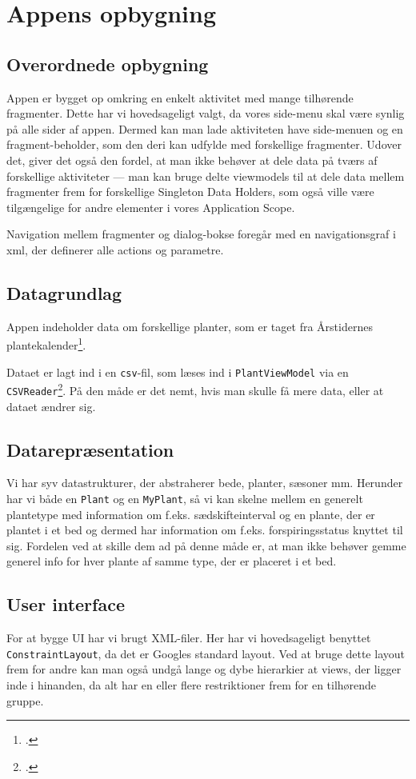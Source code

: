 \section{Appens opbygning}

\subsection{Overordnede opbygning}
Appen er bygget op omkring en enkelt aktivitet med mange tilhørende fragmenter. Dette har vi hovedsageligt valgt, da vores side-menu skal være synlig på alle sider af appen. Dermed kan man lade aktiviteten have side-menuen og en fragment-beholder, som den deri kan udfylde med forskellige fragmenter. Udover det, giver det også den fordel, at man ikke behøver at dele data på tværs af forskellige aktiviteter --- man kan bruge delte viewmodels til at dele data mellem fragmenter frem for forskellige Singleton Data Holders, som også ville være tilgængelige for andre elementer i vores Application Scope.

Navigation mellem fragmenter og dialog-bokse foregår med en navigationsgraf i xml, der definerer alle actions og parametre.

\subsection{Datagrundlag}
Appen indeholder data om forskellige planter, som er taget fra Årstidernes plantekalender\footcite{aarstiderne}.

Dataet er lagt ind i en \texttt{csv}-fil, som læses ind i \texttt{PlantViewModel} via en \texttt{CSVReader}\footcite{opencsv}. På den måde er det nemt, hvis man skulle få mere data, eller at dataet ændrer sig. 

\subsection{Datarepræsentation}

Vi har syv datastrukturer, der abstraherer bede, planter, sæsoner mm. Herunder har vi både en \texttt{Plant} og en \texttt{MyPlant}, så vi kan skelne mellem en generelt plantetype med information om f.eks. sædskifteinterval og en plante, der er plantet i et bed og dermed har information om f.eks. forspiringsstatus knyttet til sig. Fordelen ved at skille dem ad på denne måde er, at man ikke behøver gemme generel info for hver plante af samme type, der er placeret i et bed.

\subsection{User interface}
For at bygge UI har vi brugt XML-filer. Her har vi hovedsageligt benyttet \texttt{ConstraintLayout}, da det er Googles standard layout. Ved at bruge dette layout frem for andre kan man også undgå lange og dybe hierarkier at views, der ligger inde i hinanden, da alt har en eller flere restriktioner frem for en tilhørende gruppe.

